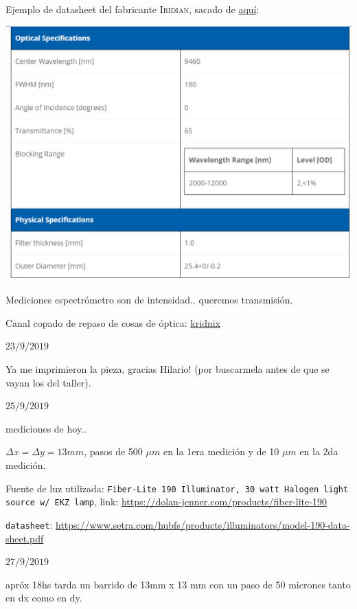 \documentclass[12pt,dvipsnames]{exam}
\begin{document}
Ejemplo de datasheet del fabricante \textsc{Iridian}, sacado de \href{https://www.iridian.ca/product/bpf-9460-180/}{aquí}:

\begin{center}
	\includegraphics[scale=0.8]{imgs/datasheet_modelo.png}
\end{center}

Mediciones espectrómetro son de intensidad.. queremos transmisión.

Canal copado de repaso de cosas de óptica: \href{https://www.youtube.com/user/kridnix/videos}{kridnix}

\newpage
\hrulefill

$23/9/2019$

Ya me imprimieron la pieza, gracias Hilario! (por buscarmela antes de que se vayan los del taller).


\hrulefill

$25/9/2019$

mediciones de hoy.. 

$\Delta x = \Delta y = 13 mm$, pasos de 500 $\mu m$ en la 1era medición y de 10 $\mu m$ en la 2da medición.

Fuente de luz utilizada: \texttt{Fiber-Lite 190 Illuminator, 30 watt Halogen light source w/ EKZ lamp}, link: \url{https://dolan-jenner.com/products/fiber-lite-190}

\texttt{datasheet}: \url{https://www.setra.com/hubfs/products/illuminators/model-190-data-sheet.pdf}


\hrulefill

$27/9/2019$

apróx 18hs tarda un barrido de 13mm x 13 mm con un paso de 50 micrones tanto en dx como en dy.
\end{document}
